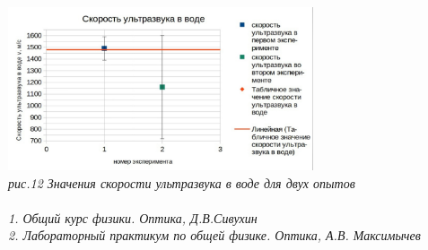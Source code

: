 \documentclass[a4paper]{article}
\begin{document}
\begin{multicols}{2}
\includegraphics[width=9cm]{g4}\\
\textit{рис.12 Значения скорости ультразвука в воде для двух опытов}\\
\\
\textit{1. Общий курс физики. Оптика, Д.В.Сивухин}\\
\textit{2. Лабораторный практикум по общей физике. Оптика, А.В. Максимычев}\\
\end{multicols}
\end{document}
